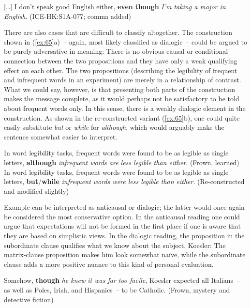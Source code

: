 \ea\label{ex:64}[…] I don’t speak good English either, \textbf{even} \textbf{though} \textit{I’m taking a major in English}. (ICE-HK:S1A-077; comma added)
\z

There are also cases that are difficult to classify altogether. The construction shown in (\ref{ex:65}a)~– again, most likely classified as dialogic~– could be argued to be purely adversative in meaning: There is no obvious causal or conditional connection between the two propositions and they have only a weak qualifying effect on each other. The two propositions (describing the legibility of frequent and infrequent words in an experiment) are merely in a relationship of contrast. What we could say, however, is that presenting both parts of the construction makes the message complete, as it would perhaps not be satisfactory to be told about frequent words only. In this sense, there is a weakly dialogic element in the construction. As shown in the re-constructed variant (\ref{ex:65}b), one could quite easily substitute \textit{but} or \textit{while} for \textit{although}, which would arguably make the sentence somewhat easier to interpret.

\ea\label{ex:65}
    \ea\label{ex:65a}   \label{bkm:Ref488064836}In word legibility tasks, frequent words were found to be as legible as single letters, \textbf{although} \textit{infrequent words are less legible than either}. (Frown, learned)\\
    \ex\label{ex:65b}In word legibility tasks, frequent words were found to be as legible as single letters, \textbf{but}/\textbf{while} \textit{infrequent words were less legible than either}. (Re-constructed and modified slightly)\\
\z
\z

Example  can be interpreted as anticausal or dialogic; the latter would once again be considered the most conservative option. In the anticausal reading one could argue that expectations will not be formed in the first place if one is aware that they are based on simplistic views. In the dialogic reading, the proposition in the subordinate clause qualifies what we know about the subject, Koesler: The matrix-clause proposition makes him look somewhat naïve, while the subordinate clause adds a more positive nuance to this kind of personal evaluation.

\ea\label{ex:66}\label{bkm:Ref488064838}Somehow, \textbf{though} \textit{he knew it was far too facile}, Koesler expected all Italians~– as well as Poles, Irish, and Hispanics~– to be Catholic. (Frown, mystery and detective fiction)
\z

